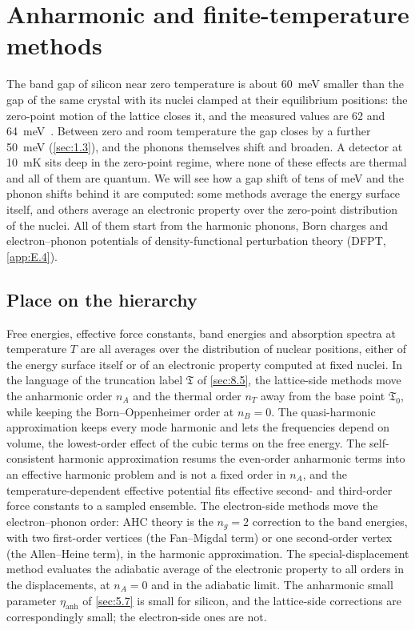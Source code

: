 \section{Anharmonic and finite-temperature methods}\label{app:E.8}

The band gap of silicon near zero temperature is about \SI{60}{meV} smaller than the gap of the same crystal with its nuclei clamped at their equilibrium positions: the zero-point motion of the lattice closes it, and the measured values are 62 and \SI{64}{meV}~\cite[Table~VI]{ponce2015temperature}. Between zero and room temperature the gap closes by a further \SI{50}{meV} (\cref{sec:1.3}), and the phonons themselves shift and broaden. A detector at \SI{10}{mK} sits deep in the zero-point regime, where none of these effects are thermal and all of them are quantum. We will see how a gap shift of tens of meV and the phonon shifts behind it are computed: some methods average the energy surface itself, and others average an electronic property over the zero-point distribution of the nuclei. All of them start from the harmonic phonons, Born charges and electron--phonon potentials of density-functional perturbation theory (DFPT, \cref{app:E.4}).

\subsection{Place on the hierarchy}

Free energies, effective force constants, band energies and absorption spectra at temperature $T$ are all averages over the distribution of nuclear positions, either of the energy surface itself or of an electronic property computed at fixed nuclei. In the language of the truncation label $\mathfrak{T}$ of \cref{sec:8.5}, the lattice-side methods move the anharmonic order $n_A$ and the thermal order $n_T$ away from the base point $\mathfrak{T}_0$, while keeping the Born--Oppenheimer order at $n_B = 0$. The quasi-harmonic approximation keeps every mode harmonic and lets the frequencies depend on volume, the lowest-order effect of the cubic terms on the free energy. The self-consistent harmonic approximation resums the even-order anharmonic terms into an effective harmonic problem and is not a fixed order in $n_A$, and the temperature-dependent effective potential fits effective second- and third-order force constants to a sampled ensemble. The electron-side methods move the electron--phonon order: AHC theory is the $n_g = 2$ correction to the band energies, with two first-order vertices (the Fan--Migdal term) or one second-order vertex (the Allen--Heine term), in the harmonic approximation. The special-displacement method evaluates the adiabatic average of the electronic property to all orders in the displacements, at $n_A = 0$ and in the adiabatic limit. The anharmonic small parameter $\eta_{\mathrm{anh}}$ of \cref{sec:5.7} is small for silicon, and the lattice-side corrections are correspondingly small; the electron-side ones are not.

